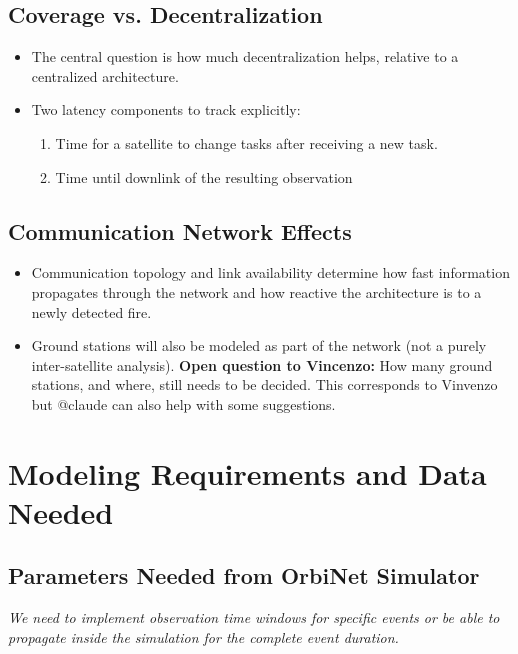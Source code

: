 \documentclass[11pt]{article}
\newcommand{\vincenzoq}[1]{\textcolor{vincenzoq}{\textbf{Open question to Vincenzo:}} #1}
\begin{document}
\subsection{Coverage vs. Decentralization}
\begin{itemize}[leftmargin=1.2cm]
    \item The central question is how much decentralization helps, relative to a centralized architecture.
    \item Two latency components to track explicitly:
    \begin{enumerate}
        \item Time for a satellite to change tasks after receiving a new task.
        \item Time until downlink of the resulting observation
    \end{enumerate}
\end{itemize}

\subsection{Communication Network Effects}
\begin{itemize}[leftmargin=1.2cm]
    \item Communication topology and link availability determine how fast information propagates through the network and how reactive the architecture is to a newly detected fire.
    \item Ground stations will also be modeled as part of the network (not a purely inter-satellite analysis). \vincenzoq{How many ground stations, and where, still needs to be decided. This corresponds to Vinvenzo but @claude can also help with some suggestions.}
\end{itemize}

\section{Modeling Requirements and Data Needed}

\subsection{Parameters Needed from OrbiNet Simulator}

\textit{We need to implement observation time windows for specific events or be able to propagate inside the simulation for the complete event duration.}
\end{document}
